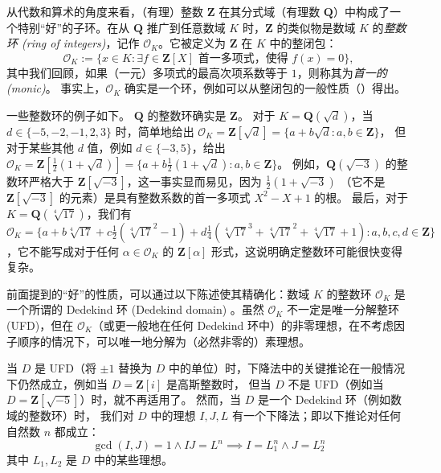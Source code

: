 \documentclass[sigplan,10pt,nonacm,
screen]{acmart} \settopmatter{printfolios=true,printccs=false,printacmref=false}
\newcommand{\coloneqq}{:=}
\newcommand{\QQ}{\mathbf{Q}}
\newcommand{\ZZ}{\mathbf{Z}}
\newcommand{\OK}{\mathcal{O}_K}
\begin{document}
从代数和算术的角度来看，（有理）整数 $\ZZ$ 在其分式域（有理数 $\QQ$）中构成了一个特别“好”的子环。在从 $\QQ$ 推广到任意数域 $K$ 时，$\ZZ$ 的类似物是数域 $K$ 的\emph{整数环 (ring of integers)}，记作 $\OK$。它被定义为 $\ZZ$ 在 $K$ 中的整闭包：
\begin{equation*}
\OK\coloneqq \{ x \in K : \exists f \in \ZZ[X] \text{ 首一多项式，使得 } f(x)=0 \},
\end{equation*}
其中我们回顾，如果（一元）多项式的最高次项系数等于 $1$，则称其为\emph{首一的 (monic)}。
事实上，$\OK$ 确实是一个环，例如可以从整闭包的一般性质（\cite[第 I.2 节]{Neukirch}）得出。

一些整数环的例子如下。
$\QQ$ 的整数环确实是 $\ZZ$。
对于 $K= \QQ(\sqrt{d})$，当 $d \in \{-5,-2,-1,2,3\}$ 时，简单地给出 $\OK=\ZZ[\sqrt{d}]=\{a+b \sqrt{d} : a,b \in \ZZ \}$，
但对于某些其他 $d$ 值，例如 $d \in \{-3,5\}$，给出 $\OK=\ZZ[\frac{1}{2}(1+\sqrt{d})]=\{a+b \frac{1}{2}(1+\sqrt{d}) : a,b \in \ZZ \}$。
例如，$\QQ(\sqrt{-3})$ 的整数环严格大于 $\ZZ[\sqrt{-3}]$，这一事实显而易见，因为 $\frac{1}{2}(1+\sqrt{-3})$
（它不是 $\ZZ[\sqrt{-3}]$ 的元素）是具有整数系数的首一多项式 $X^2-X+1$ 的根。
最后，对于 $K=\QQ(\sqrt[4]{17})$，我们有 $\OK=\{a+b\sqrt[4]{17}+c\frac{1}{2}(\sqrt[4]{17}^2-1)+d \frac{1}{4}(\sqrt[4]{17}^3+\sqrt[4]{17}^2+\sqrt[4]{17}+1) : a,b,c,d \in \ZZ \}$，它不能写成对于任何 $\alpha \in \OK$ 的 $\ZZ[\alpha]$ 形式，这说明确定整数环可能很快变得复杂。

前面提到的“好”的性质，可以通过以下陈述使其精确化：数域 $K$ 的整数环 $\OK$ 是一个所谓的 Dedekind 环 (Dedekind domain) \cite[第 2 节]{baanen_formalization_2021}。虽然 $\OK$ 不一定是唯一分解整环 (UFD)，但在 $\OK$（或更一般地在任何 Dedekind 环中）的非零理想，在不考虑因子顺序的情况下，可以唯一地分解为（必然非零的）素理想。

当 $D$ 是 UFD（将 $\pm 1$ 替换为 $D$ 中的单位）时，下降法中的关键推论在一般情况下仍然成立，例如当 $D=\ZZ[i]$ 是高斯整数时，
但当 $D$ 不是 UFD（例如当 $D=\ZZ[\sqrt{-5}]$）时，就不再适用了。
然而，当 $D$ 是一个 Dedekind 环（例如数域的整数环）时，
我们对 $D$ 中的理想 $I, J, L$ 有一个下降法；即以下推论对任何自然数 $n$ 都成立：
\begin{equation}\label{eqn:Ideal_descent}
  \gcd(I,J)=1 \wedge I J=L^n \implies I=L_1^n \wedge J=L_2^n
\end{equation}
其中 $L_1, L_2$ 是 $D$ 中的某些理想。
\end{document}
